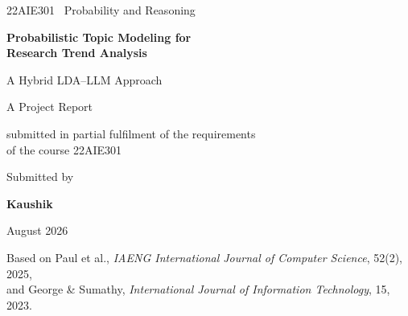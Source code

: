 \documentclass[11pt,a4paper]{article}
\begin{document}
\begin{titlepage}
\hypersetup{pageanchor=false}
\thispagestyle{empty}
\centering

\vspace*{1.6cm}

{\large 22AIE301 \textperiodcentered\ Probability and Reasoning}

\vspace{2.4cm}

{\LARGE\bfseries Probabilistic Topic Modeling for\\[0.3em]
Research Trend Analysis}

\vspace{0.7cm}

{\Large A Hybrid LDA--LLM Approach}

\vspace{2.2cm}

{\large A Project Report}

\vspace{0.35cm}

{\normalsize submitted in partial fulfilment of the requirements\\
of the course 22AIE301}

\vspace{1.8cm}

{\normalsize Submitted by}

\vspace{0.35cm}

{\Large\textbf{Kaushik}}

\vfill

{\normalsize August 2026}

\vspace{1.4cm}

{\small Based on Paul et al., \emph{IAENG International Journal of Computer Science}, 52(2), 2025,\\
and George \& Sumathy, \emph{International Journal of Information Technology}, 15, 2023.}

\vspace{0.8cm}
\end{titlepage}

\hypersetup{pageanchor=true}
\end{document}
